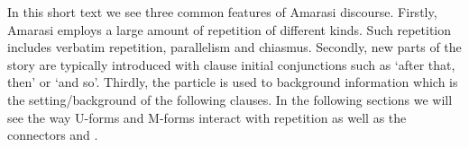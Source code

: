In this short text we see three common features of Amarasi discourse.
Firstly, Amarasi employs a large amount of repetition of different kinds.
Such repetition includes verbatim repetition, parallelism and chiasmus.
Secondly, new parts of the story are typically introduced with clause initial
conjunctions such as  `after that, then' or  `and so'.
Thirdly, the particle  is used to background information
which is the setting/background of the following clauses.
In the following sections we will see the way U-forms and M-forms
interact with repetition as well as the connectors  and .